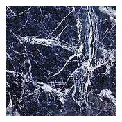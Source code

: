 \begin{figure}[]
\begin{subfigure}{\textwidth}
\begin{subfigure}{0.19\textwidth}
        \end{subfigure}
        
        \begin{subfigure}{0.19\textwidth}
            \centering
            \includegraphics[width=\textwidth]{images/04-experiment03/staircase_marble_target.jpg}
        \end{subfigure}
        \hfill
        \begin{subfigure}{0.19\textwidth}
            \centering
            \begin{tikzpicture}

\end{tikzpicture}
\end{subfigure}
\end{subfigure}
\end{figure}

